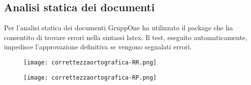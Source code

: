 \documentclass[../piano-di-qualifica.tex]{subfiles}
\begin{document}
\subsection{Analisi statica dei documenti}%
\label{sub:analisi_statica_doc}
Per l'analisi statica dei documenti GruppOne ha utilizzato il package  che ha consentito di trovare errori nella sintassi latex.
Il test, eseguito automaticamente, impedisce l'approvazione definitiva se vengono segnalati errori.

\begin{figure}[H]
  \centering
  \texttt{[image: correttezzaortografica-RR.png]}%
\end{figure}


\begin{figure}[H]
  \centering
  \texttt{[image: correttezzaortografica-RP.png]}%
\end{figure}



\end{document}
